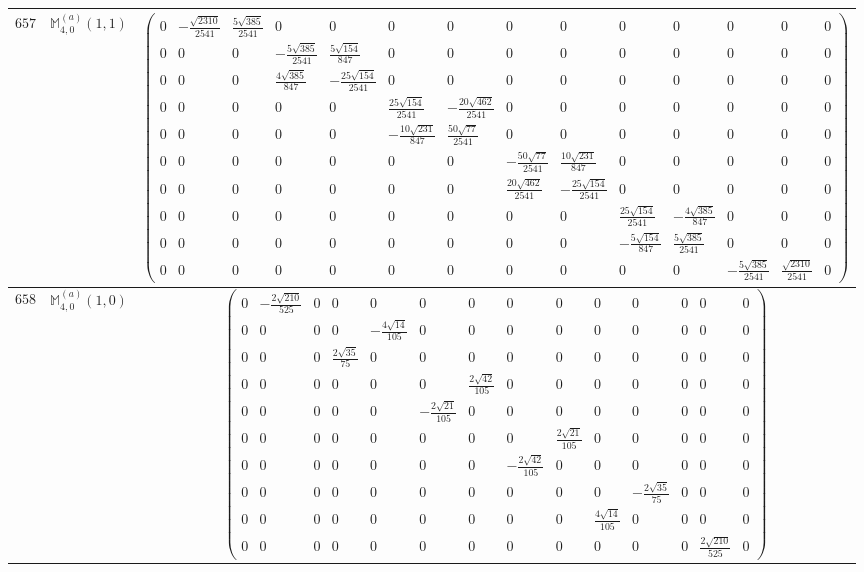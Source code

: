 \documentclass[fleqn,8pt,landscape]{jsarticle}
\begin{document}
\begin{center}
\begin{longtable}{ccc}
$ 657 $ & $ \mathbb{M}_{4,0}^{(a)}(1,1) $ & $ \begin{pmatrix} 0 & - \frac{\sqrt{2310}}{2541} & \frac{5 \sqrt{385}}{2541} & 0 & 0 & 0 & 0 & 0 & 0 & 0 & 0 & 0 & 0 & 0 \\ 0 & 0 & 0 & - \frac{5 \sqrt{385}}{2541} & \frac{5 \sqrt{154}}{847} & 0 & 0 & 0 & 0 & 0 & 0 & 0 & 0 & 0 \\ 0 & 0 & 0 & \frac{4 \sqrt{385}}{847} & - \frac{25 \sqrt{154}}{2541} & 0 & 0 & 0 & 0 & 0 & 0 & 0 & 0 & 0 \\ 0 & 0 & 0 & 0 & 0 & \frac{25 \sqrt{154}}{2541} & - \frac{20 \sqrt{462}}{2541} & 0 & 0 & 0 & 0 & 0 & 0 & 0 \\ 0 & 0 & 0 & 0 & 0 & - \frac{10 \sqrt{231}}{847} & \frac{50 \sqrt{77}}{2541} & 0 & 0 & 0 & 0 & 0 & 0 & 0 \\ 0 & 0 & 0 & 0 & 0 & 0 & 0 & - \frac{50 \sqrt{77}}{2541} & \frac{10 \sqrt{231}}{847} & 0 & 0 & 0 & 0 & 0 \\ 0 & 0 & 0 & 0 & 0 & 0 & 0 & \frac{20 \sqrt{462}}{2541} & - \frac{25 \sqrt{154}}{2541} & 0 & 0 & 0 & 0 & 0 \\ 0 & 0 & 0 & 0 & 0 & 0 & 0 & 0 & 0 & \frac{25 \sqrt{154}}{2541} & - \frac{4 \sqrt{385}}{847} & 0 & 0 & 0 \\ 0 & 0 & 0 & 0 & 0 & 0 & 0 & 0 & 0 & - \frac{5 \sqrt{154}}{847} & \frac{5 \sqrt{385}}{2541} & 0 & 0 & 0 \\ 0 & 0 & 0 & 0 & 0 & 0 & 0 & 0 & 0 & 0 & 0 & - \frac{5 \sqrt{385}}{2541} & \frac{\sqrt{2310}}{2541} & 0 \end{pmatrix} $ \\ \hline
$ 658 $ & $ \mathbb{M}_{4,0}^{(a)}(1,0) $ & $ \begin{pmatrix} 0 & - \frac{2 \sqrt{210}}{525} & 0 & 0 & 0 & 0 & 0 & 0 & 0 & 0 & 0 & 0 & 0 & 0 \\ 0 & 0 & 0 & 0 & - \frac{4 \sqrt{14}}{105} & 0 & 0 & 0 & 0 & 0 & 0 & 0 & 0 & 0 \\ 0 & 0 & 0 & \frac{2 \sqrt{35}}{75} & 0 & 0 & 0 & 0 & 0 & 0 & 0 & 0 & 0 & 0 \\ 0 & 0 & 0 & 0 & 0 & 0 & \frac{2 \sqrt{42}}{105} & 0 & 0 & 0 & 0 & 0 & 0 & 0 \\ 0 & 0 & 0 & 0 & 0 & - \frac{2 \sqrt{21}}{105} & 0 & 0 & 0 & 0 & 0 & 0 & 0 & 0 \\ 0 & 0 & 0 & 0 & 0 & 0 & 0 & 0 & \frac{2 \sqrt{21}}{105} & 0 & 0 & 0 & 0 & 0 \\ 0 & 0 & 0 & 0 & 0 & 0 & 0 & - \frac{2 \sqrt{42}}{105} & 0 & 0 & 0 & 0 & 0 & 0 \\ 0 & 0 & 0 & 0 & 0 & 0 & 0 & 0 & 0 & 0 & - \frac{2 \sqrt{35}}{75} & 0 & 0 & 0 \\ 0 & 0 & 0 & 0 & 0 & 0 & 0 & 0 & 0 & \frac{4 \sqrt{14}}{105} & 0 & 0 & 0 & 0 \\ 0 & 0 & 0 & 0 & 0 & 0 & 0 & 0 & 0 & 0 & 0 & 0 & \frac{2 \sqrt{210}}{525} & 0 \end{pmatrix} $ \\ \hline

\end{longtable}
\end{center}
\end{document}
